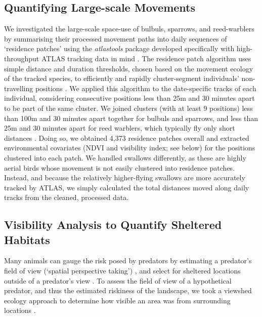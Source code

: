 
\subsection*{Quantifying Large-scale Movements}

We investigated the large-scale space-use of bulbuls, sparrows, and reed-warblers by summarising their processed movement paths into daily sequences of `residence patches' using the \textit{atlastools} package developed specifically with high-throughput ATLAS tracking data in mind \citep{gupte2022d}.
The residence patch algorithm uses simple distance and duration thresholds, chosen based on the movement ecology of the tracked species, to efficiently and rapidly cluster-segment individuals' non-travelling positions \citep{gupte2022d}.
We applied this algorithm to the date-specific tracks of each individual, considering consecutive positions less than 25m and 30 minutes apart to be part of the same cluster.
We joined clusters (with at least 9 positions) less than 100m and 30 minutes apart together for bulbuls and sparrows, and less than 25m and 30 minutes apart for reed warblers, which typically fly only short distances \parencite{kiat2016}.
Doing so, we obtained 4,373 residence patches overall and extracted environmental covariates (NDVI and visibility index; see below) for the positions clustered into each patch.
We handled swallows differently, as these are highly aerial birds whose movement is not easily clustered into residence patches.
Instead, and because the relatively higher-flying swallows are more accurately tracked by ATLAS, we simply calculated the total distances moved along daily tracks from the cleaned, processed data.


\subsection*{Visibility Analysis to Quantify Sheltered Habitats}

Many animals can gauge the risk posed by predators by estimating a predator's field of view (`spatial perspective taking') \parencite{emery2000,bruce2003,davidson2016}, and select for sheltered locations outside of a predator's view \citep{hampton1994,krams2001,watve2002}.
To assess the field of view of a hypothetical predator, and thus the estimated riskiness of the landscape, we took a viewshed ecology approach to determine how visible an area was from surrounding locations \citep{aben2018,aben2021}.

